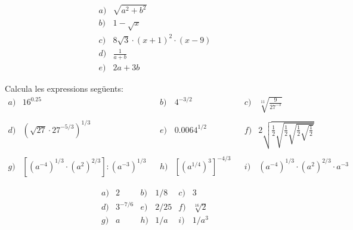 \begin{indicacio}
%
\[
\begin{array}{ll}
a) & \sqrt{a^{2}+b^{2}} \\ 
b) & 1-\sqrt{x} \\ 
c) & 8\sqrt{3}\cdot (x+1)^{2}\cdot (x-9) \\ 
d) & \frac{1}{a+b} \\ 
e) & 2a+3b%
\end{array}%
\]
\end{indicacio}

\begin{exercici}
Calcula les expressions següents:%
\[
\begin{array}{llllllll}
a) & 16^{0.25} &  & b) & 4^{-3/2} &  & c) & \sqrt[11]{\frac{9}{27^{-3}}} \\ 
&  &  &  &  &  &  &  \\ 
d) & \left( \sqrt{27}\cdot 27^{-5/3}\right) ^{1/3} &  & e) & 0.0064^{1/2} & 
& f) & 2\sqrt{\frac{1}{2}\sqrt{\frac{1}{2}\sqrt{\frac{1}{2}\sqrt{\frac{1}{2}}%
}}} \\ 
&  &  &  &  &  &  &  \\ 
g) & \left[ \left( a^{-4}\right) ^{1/3}\cdot \left( a^{2}\right) ^{2/3}%
\right] :\left( a^{-3}\right) ^{1/3} &  & h) & \left[ \left( a^{1/4}\right)
^{3}\right] ^{-4/3} &  & i) & \left( a^{-4}\right) ^{1/3}\cdot \left(
a^{2}\right) ^{2/3}\cdot a^{-3}%
\end{array}%
\]

\end{exercici}

\begin{indicacio}
%
\[
\begin{array}{cccccc}
a) & 2 & b) & 1/8 & c) & 3 \\ 
d) & 3^{-7/6} & e) & 2/25 & f) & \sqrt[16]{2} \\ 
g) & a & h) & 1/a & i) & 1/a^{3}%
\end{array}%
\]
\end{indicacio}
